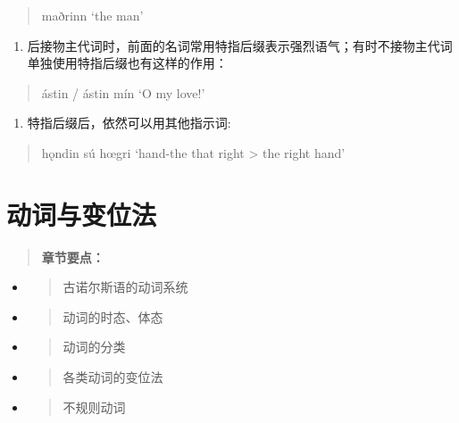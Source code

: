 \begin{quote}
maðrinn `the man'
\end{quote}

\begin{enumerate}
\def\labelenumi{\arabic{enumi})}
\setcounter{enumi}{1}
\item
  后接物主代词时，前面的名词常用特指后缀表示强烈语气；有时不接物主代词单独使用特指后缀也有这样的作用：
\end{enumerate}

\begin{quote}
ástin / ástin mín `O my love!'
\end{quote}

\begin{enumerate}
\def\labelenumi{\arabic{enumi})}
\setcounter{enumi}{2}
\item
  特指后缀后，依然可以用其他指示词:
\end{enumerate}

\begin{quote}
hǫndin sú hœgri `hand-the that right \textgreater{} the right hand'
\end{quote}

\section{动词与变位法}\label{动词与变位法}

\begin{quote}
\textbf{章节要点：}
\end{quote}

\begin{itemize}
\item
  \begin{quote}
  古诺尔斯语的动词系统
  \end{quote}
\item
  \begin{quote}
  动词的时态、体态
  \end{quote}
\item
  \begin{quote}
  动词的分类
  \end{quote}
\item
  \begin{quote}
  各类动词的变位法
  \end{quote}
\item
  \begin{quote}
  不规则动词
  \end{quote}
\end{itemize}

